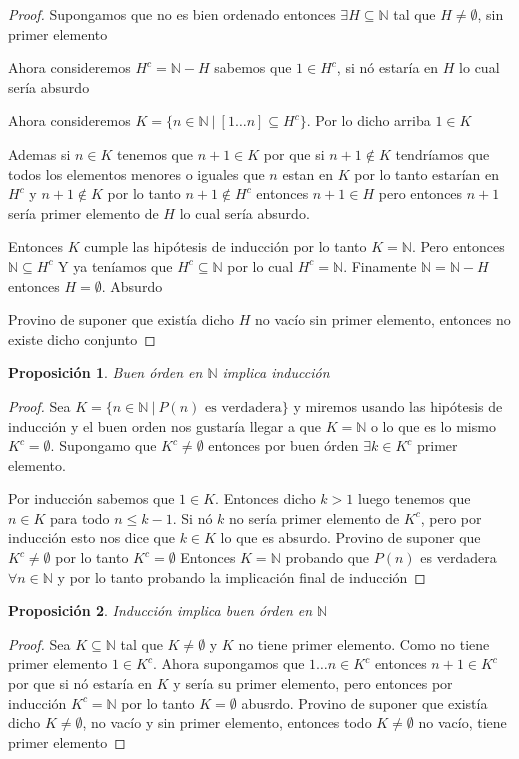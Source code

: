 \documentclass{article}
\theoremstyle{break}
\newtheorem{proposition}{Proposición}
\def \N{\mathbb{N}}
\begin{document}
    \begin{proof}
        Supongamos que no es bien ordenado entonces $\exists H \subseteq \N$ tal que $H \neq \emptyset$,
        sin primer elemento

        Ahora consideremos $H^c = \N - H $ sabemos que $1 \in H^c$, si nó estaría en $H$ lo cual sería
        absurdo

        Ahora consideremos $K = \{n \in \N \ | \ [1\ldots n] \subseteq H^c\}$. Por lo dicho arriba 
        $1\in K$

        Ademas si $n\in K$ tenemos que $n+1 \in K$ por que si $n+1 \notin K$ tendríamos que todos
        los elementos menores o iguales que $n$ estan en $K$ por lo tanto estarían en $H^c$ y 
        $n+1 \notin K$ por lo tanto $n+1 \notin H^c$ entonces $n+1 \in H$ pero entonces $n+1$ sería
        primer elemento de $H$ lo cual sería absurdo.

        Entonces $K$ cumple las hipótesis de inducción por lo tanto $K=\N$. Pero entonces $\N \subseteq H^c$
        Y ya teníamos que $H^c\subseteq \N$ por lo cual $H^c = \N$. Finamente $\N=\N - H$ entonces $H = \emptyset$. Absurdo

        Provino de suponer que existía dicho $H$ no vacío sin primer elemento, entonces no existe dicho
        conjunto
    \end{proof}
    \begin{proposition}
        Buen órden en $\N$ implica inducción
    \end{proposition}
    \begin{proof}
        Sea $K= \{n\in\N \ | \ P(n) \text{ es verdadera}\}$ y miremos usando las hipótesis de
        inducción y el buen orden nos gustaría llegar a que $K=\N$ o lo que es lo mismo 
        $K^c = \emptyset$. Supongamo que $K^c \neq \emptyset$ entonces por buen órden
        $\exists k \in K^c$ primer elemento. 

        Por inducción sabemos que $1 \in K$. Entonces dicho $k > 1$ luego tenemos que $n\in K$ para todo $n \leq k-1$.
        Si nó $k$ no sería primer elemento de $K^c$, pero por inducción esto nos dice que $k \in K$
        lo que es absurdo. Provino de suponer que $K^c \neq \emptyset$ por lo tanto $K^c=\emptyset$
        Entonces $K = \N$ probando que $P(n)$ es verdadera $\forall n\in\N$ y por lo tanto probando
        la implicación final de inducción
    \end{proof}

    \begin{proposition}
        Inducción implica buen órden en $\N$
    \end{proposition}
    \begin{proof}
        Sea $K \subseteq \N$ tal que $K\neq \emptyset$ y $K$ no tiene primer elemento.
        Como no tiene primer elemento $1 \in K^c$. Ahora supongamos que $1\ldots n \in K^c$ entonces
        $n+1 \in K^c$ por que si nó estaría en $K$ y sería su primer elemento, pero entonces por
        inducción $K^c = \N $ por lo tanto $K = \emptyset$ abusrdo. Provino de suponer que existía
        dicho $K\neq \emptyset$, no vacío y sin primer elemento, entonces todo $K\neq \emptyset$ 
        no vacío, tiene primer elemento 
    \end{proof}
\end{document}
